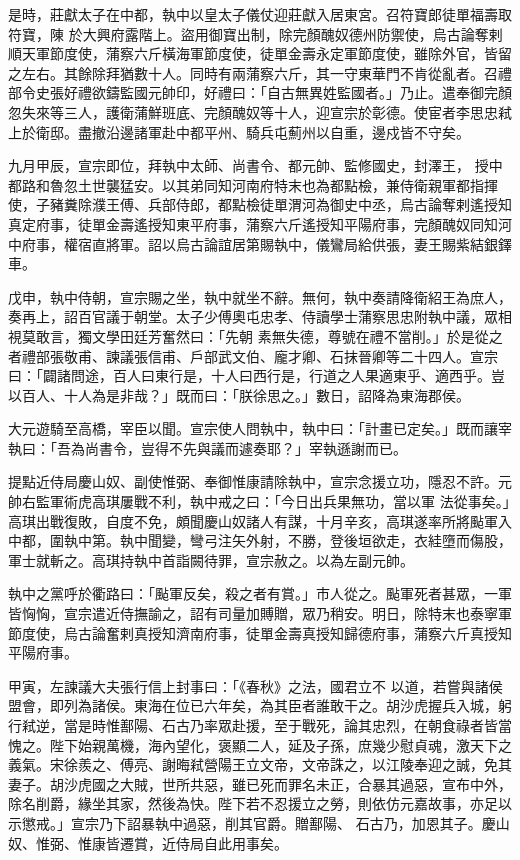 \begin{pinyinscope}
 是時，莊獻太子在中都，執中以皇太子儀仗迎莊獻入居東宮。召符寶郎徒單福壽取符寶，陳
 於大興府露階上。盜用御寶出制，除完顏醜奴德州防禦使，烏古論奪剌順天軍節度使，蒲察六斤橫海軍節度使，徒單金壽永定軍節度使，雖除外官，皆留之左右。其餘除拜猶數十人。同時有兩蒲察六斤，其一守東華門不肯從亂者。召禮部令史張好禮欲鑄監國元帥印，好禮曰：「自古無異姓監國者。」乃止。遣奉御完顏忽失來等三人，護衛蒲鮮班底、完顏醜奴等十人，迎宣宗於彰德。使宦者李思忠弒上於衛邸。盡撤沿邊諸軍赴中都平州、騎兵屯薊州以自重，邊戍皆不守矣。



 九月甲辰，宣宗即位，拜執中太師、尚書令、都元帥、監修國史，封澤王，
 授中都路和魯忽土世襲猛安。以其弟同知河南府特末也為都點檢，兼侍衛親軍都指揮使，子豬糞除濮王傅、兵部侍郎，都點檢徒單渭河為御史中丞，烏古論奪剌遙授知真定府事，徒單金壽遙授知東平府事，蒲察六斤遙授知平陽府事，完顏醜奴同知河中府事，權宿直將軍。詔以烏古論誼居第賜執中，儀鸞局給供張，妻王賜紫結銀鐸車。



 戊申，執中侍朝，宣宗賜之坐，執中就坐不辭。無何，執中奏請降衛紹王為庶人，奏再上，詔百官議于朝堂。太子少傅奧屯忠孝、侍讀學士蒲察思忠附執中議，眾相視莫敢言，獨文學田廷芳奮然曰：「先朝
 素無失德，尊號在禮不當削。」於是從之者禮部張敬甫、諫議張信甫、戶部武文伯、龐才卿、石抹晉卿等二十四人。宣宗曰：「闢諸問途，百人曰東行是，十人曰西行是，行道之人果適東乎、適西乎。豈以百人、十人為是非哉？」既而曰：「朕徐思之。」數日，詔降為東海郡侯。



 大元遊騎至高橋，宰臣以聞。宣宗使人問執中，執中曰：「計畫已定矣。」既而讓宰執曰：「吾為尚書令，豈得不先與議而遽奏耶？」宰執遜謝而已。



 提點近侍局慶山奴、副使惟弼、奉御惟康請除執中，宣宗念援立功，隱忍不許。元帥右監軍術虎高琪屢戰不利，執中戒之曰：「今日出兵果無功，當以軍
 法從事矣。」高琪出戰復敗，自度不免，頗聞慶山奴諸人有謀，十月辛亥，高琪遂率所將颭軍入中都，圍執中第。執中聞變，彎弓注矢外射，不勝，登後垣欲走，衣絓墮而傷股，軍士就斬之。高琪持執中首詣闕待罪，宣宗赦之。以為左副元帥。



 執中之黨呼於衢路曰：「颭軍反矣，殺之者有賞。」市人從之。颭軍死者甚眾，一軍皆恟恟，宣宗遣近侍撫諭之，詔有司量加賻贈，眾乃稍安。明日，除特末也泰寧軍節度使，烏古論奮剌真授知濟南府事，徒單金壽真授知歸德府事，蒲察六斤真授知平陽府事。



 甲寅，左諫議大夫張行信上封事曰：「《春秋》之法，國君立不
 以道，若嘗與諸侯盟會，即列為諸侯。東海在位已六年矣，為其臣者誰敢干之。胡沙虎握兵入城，躬行弒逆，當是時惟鄯陽、石古乃率眾赴援，至于戰死，論其忠烈，在朝食祿者皆當愧之。陛下始親萬機，海內望化，褒顯二人，延及子孫，庶幾少慰貞魂，激天下之義氣。宋徐羨之、傅亮、謝晦弒營陽王立文帝，文帝誅之，以江陵奉迎之誠，免其妻子。胡沙虎國之大賊，世所共惡，雖已死而罪名未正，合暴其過惡，宣布中外，除名削爵，緣坐其家，然後為快。陛下若不忍援立之勞，則依仿元嘉故事，亦足以示懲戒。」宣宗乃下詔暴執中過惡，削其官爵。贈鄯陽、
 石古乃，加恩其子。慶山奴、惟弼、惟康皆遷賞，近侍局自此用事矣。




\end{pinyinscope}
